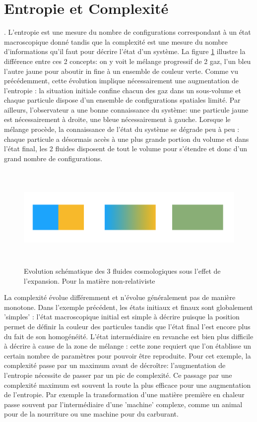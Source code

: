 \section{Entropie et Complexité}
. L'entropie est une mesure du nombre de configurations correspondant à un état macroscopique donné tandis que la complexité est une mesure du nombre d'informations qu'il faut pour décrire l'état d'un système. La figure \ref{f:melange} illustre la différence entre ces 2 concepts: on y voit le mélange progressif de 2 gaz, l'un bleu l'autre jaune pour aboutir in fine à un ensemble de couleur verte. Comme vu précédemment, cette évolution implique nécessairement une augmentation de l'entropie : la situation initiale confine chacun des gaz dans un sous-volume et chaque particule dispose d'un ensemble de configurations spatiales limité. Par ailleurs, l'observateur a une bonne connaissance du système: une particule jaune est nécessairement à droite, une bleue nécessairement à gauche. Lorsque le mélange procède, la connaissance de l'état du système se dégrade peu à peu : chaque particule a désormais accès à une plus grande portion du volume et dans l'état final, les 2 fluides disposent de tout le volume pour s'étendre et donc d'un grand nombre de configurations.
\begin{figure}[htbp]
	\centering
		\includegraphics[height=5cm]{figs/melange.png}
	\caption{Evolution schématique des 3 fluides cosmologiques sous l'effet de l'expansion. Pour la matière non-relativiste}
	\label{f:melange}
\end{figure}

La complexité évolue différemment et n'évolue généralement pas de manière monotone. Dans l'exemple précédent, les états initiaux et finaux sont globalement 'simples' : l'état macroscopique initial est simple à décrire puisque la position permet de définir la couleur des particules tandis que l'état final l'est encore plus du fait de son homogénéité. L'état intermédiaire en revanche est bien plus difficile à décrire à cause de la zone de mélange : cette zone requiert que l'on établisse un certain nombre de paramètres pour pouvoir être reproduite. Pour cet exemple, la complexité passe par un maximum avant de décroître: l'augmentation de l'entropie nécessite de passer par un pic de complexité. Ce passage par une complexité maximum est souvent la route la plus efficace pour une augmentation de l'entropie. Par exemple la transformation d'une matière première en chaleur passe souvent par l'intermédiaire d'une 'machine' complexe, comme un animal pour de la nourriture ou une machine pour du carburant.

